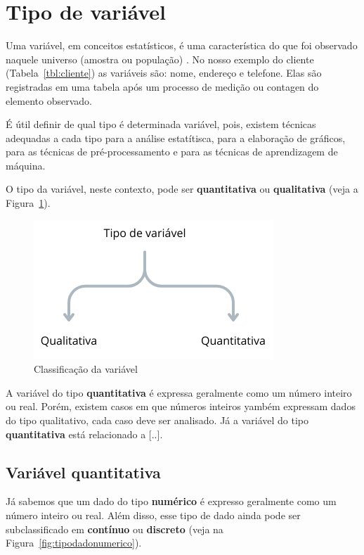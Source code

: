 \documentclass[a4paper,12pt]{book}
\begin{document}
\section{Tipo de variável}
	
Uma variável, em conceitos estatísticos, é uma característica do que foi observado naquele universo (amostra ou população) \cite{favero2017manual}. No nosso exemplo do cliente (Tabela~\ref{tbl:cliente}) as variáveis são: nome, endereço e telefone. Elas são registradas em uma tabela após um processo de medição ou contagen do elemento observado. 

É útil definir de qual tipo é determinada variável, pois, existem técnicas adequadas a cada tipo para a análise estatítisca, para a elaboração de gráficos, para as técnicas de pré-processamento e para as técnicas de aprendizagem de máquina. 

O tipo da variável, neste contexto, pode ser \textbf{quantitativa} ou \textbf{qualitativa} (veja a Figura~\ref{fig:tipodado}).
	
\begin{figure}[!h]
	\centering
	\includegraphics[width=0.7\linewidth]{figuras/tipo_variavel.png}
	\caption{Classificação da variável}
	\label{fig:tipodado}
\end{figure}
	
A variável do tipo \textbf{quantitativa} é expressa geralmente como um número inteiro ou real. Porém, existem casos em que números inteiros yambém expressam dados do tipo qualitativo, cada caso deve ser analisado. Já a variável do tipo \textbf{quantitativa} está relacionado a [..]. 
	
\subsection{Variável quantitativa}
	
	Já sabemos que um dado do tipo \textbf{numérico} é expresso geralmente como um número inteiro ou real. Além disso, esse tipo de dado ainda pode ser subclassificado em \textbf{contínuo} ou \textbf{discreto} (veja na Figura~\ref{fig:tipodadonumerico}). 
	
\end{document}
